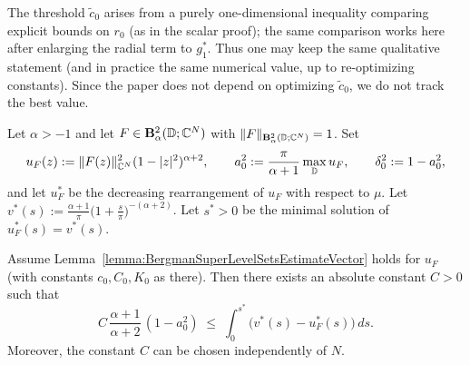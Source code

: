 \documentclass[a4paper,10pt]{amsart}
\newcommand{\D}{\mathbb{D}}
\begin{document}
\begin{numrem}
The threshold $\widetilde c_0$ arises from a purely one-dimensional inequality comparing explicit bounds
on $r_0$ (as in the scalar proof); the same comparison works here after enlarging the radial term to $g_1^\ast$.
Thus one may keep the same qualitative statement (and in practice the same numerical value, up to re-optimizing constants).
Since the paper does not depend on optimizing $\widetilde c_0$, we do not track the best value.
\end{numrem}



\begin{numlemma}\label{lemma:BergmanLowerBoundDifferenceVector}
Let $\alpha>-1$ and let $F\in \mathbf B_\alpha^2(\D;\C^N)$ with $\|F\|_{\mathbf B_\alpha^2(\D;\C^N)}=1$.
Set
\[
u_F(z):=\|F(z)\|_{\C^N}^2(1-|z|^2)^{\alpha+2},\qquad
a_0^2:=\frac{\pi}{\alpha+1}\max_{\D}u_F,\qquad \delta_0^2:=1-a_0^2,
\]
and let $u_F^*$ be the decreasing rearrangement of $u_F$ with respect to $\mu$.
Let $v^*(s):=\frac{\alpha+1}{\pi}\Big(1+\frac{s}{\pi}\Big)^{-(\alpha+2)}$.
Let $s^*>0$ be the minimal solution of $u_F^*(s)=v^*(s)$.

Assume Lemma~\ref{lemma:BergmanSuperLevelSetsEstimateVector} holds for $u_F$
(with constants $c_0,C_0,K_0$ as there).
Then there exists an absolute constant $C>0$ such that
\begin{equation}\label{eqn:BergmanLowerBoundDifferenceVector}
C\,\frac{\alpha+1}{\alpha+2}\,(1-a_0^2)
\;\le\;
\int_0^{s^*}\big(v^*(s)-u_F^*(s)\big)\,ds .
\end{equation}
Moreover, the constant $C$ can be chosen independently of $N$.
\end{numlemma}
\end{document}
